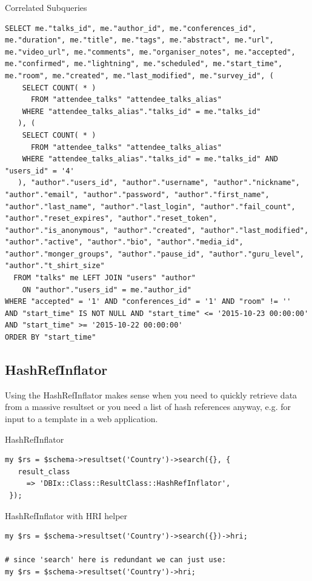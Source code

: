 \begin{frame}[fragile]{Correlated Subqueries}
\begin{lstlisting}
SELECT me."talks_id", me."author_id", me."conferences_id", me."duration", me."title", me."tags", me."abstract", me."url", me."video_url", me."comments", me."organiser_notes", me."accepted", me."confirmed", me."lightning", me."scheduled", me."start_time", me."room", me."created", me."last_modified", me."survey_id", ( 
    SELECT COUNT( * ) 
      FROM "attendee_talks" "attendee_talks_alias" 
    WHERE "attendee_talks_alias"."talks_id" = me."talks_id"
   ), ( 
    SELECT COUNT( * ) 
      FROM "attendee_talks" "attendee_talks_alias" 
    WHERE "attendee_talks_alias"."talks_id" = me."talks_id" AND "users_id" = '4'
   ), "author"."users_id", "author"."username", "author"."nickname", "author"."email", "author"."password", "author"."first_name", "author"."last_name", "author"."last_login", "author"."fail_count", "author"."reset_expires", "author"."reset_token", "author"."is_anonymous", "author"."created", "author"."last_modified", "author"."active", "author"."bio", "author"."media_id", "author"."monger_groups", "author"."pause_id", "author"."guru_level", "author"."t_shirt_size" 
  FROM "talks" me LEFT JOIN "users" "author" 
    ON "author"."users_id" = me."author_id" 
WHERE "accepted" = '1' AND "conferences_id" = '1' AND "room" != '' 
AND "start_time" IS NOT NULL AND "start_time" <= '2015-10-23 00:00:00' 
AND "start_time" >= '2015-10-22 00:00:00' 
ORDER BY "start_time"
\end{lstlisting}
\end{frame}

\subsection{HashRefInflator}

Using the HashRefInflator makes sense when you need to quickly retrieve
data from a massive resultset or you need a list of hash references anyway,
e.g. for input to a template in a web application.

\begin{frame}[fragile]{HashRefInflator}
\begin{lstlisting}
my $rs = $schema->resultset('Country')->search({}, {
   result_class
     => 'DBIx::Class::ResultClass::HashRefInflator',
 });
\end{lstlisting}
\end{frame}

\begin{frame}[fragile]{HashRefInflator with HRI helper}
\begin{lstlisting}
my $rs = $schema->resultset('Country')->search({})->hri;

# since 'search' here is redundant we can just use:
my $rs = $schema->resultset('Country')->hri;
\end{lstlisting}
\end{frame}

